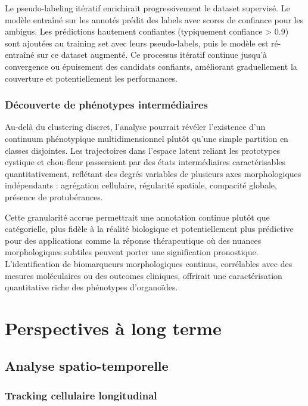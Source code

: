 Le pseudo-labeling itératif enrichirait progressivement le dataset supervisé. Le modèle entraîné sur les annotés prédit des labels avec scores de confiance pour les ambigus. Les prédictions hautement confiantes (typiquement confiance > 0.9) sont ajoutées au training set avec leurs pseudo-labels, puis le modèle est ré-entraîné sur ce dataset augmenté. Ce processus itératif continue jusqu'à convergence ou épuisement des candidats confiants, améliorant graduellement la couverture et potentiellement les performances.

\subsubsection{Découverte de phénotypes intermédiaires}

Au-delà du clustering discret, l'analyse pourrait révéler l'existence d'un continuum phénotypique multidimensionnel plutôt qu'une simple partition en classes disjointes. Les trajectoires dans l'espace latent reliant les prototypes cystique et chou-fleur passeraient par des états intermédiaires caractérisables quantitativement, reflétant des degrés variables de plusieurs axes morphologiques indépendants : agrégation cellulaire, régularité spatiale, compacité globale, présence de protubérances.

Cette granularité accrue permettrait une annotation continue plutôt que catégorielle, plus fidèle à la réalité biologique et potentiellement plus prédictive pour des applications comme la réponse thérapeutique où des nuances morphologiques subtiles peuvent porter une signification pronostique. L'identification de biomarqueurs morphologiques continus, corrélables avec des mesures moléculaires ou des outcomes cliniques, offrirait une caractérisation quantitative riche des phénotypes d'organoïdes.

\section{Perspectives à long terme}

\subsection{Analyse spatio-temporelle}

\subsubsection{Tracking cellulaire longitudinal}

